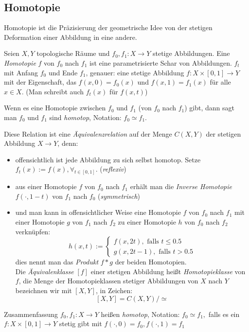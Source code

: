 \documentclass[a4paper,10pt]{scrartcl}
\begin{document}
\subsection{Homotopie}
Homotopie ist die Präzisierung der geometrische Idee von der stetigen Deformation einer Abbildung in eine andere.
\begin{df}[Homotopie]
 Seien $X,Y$ topologische Räume und $f_0, f_1: X\to Y$ stetige Abbildungen. Eine \emph{Homotopie} $f$ von $f_0$ nach $f_1$ ist eine parametrisierte Schar von Abbildungen.
$f_t$ mit Anfang $f_0$ und Ende $f_1$, genauer: eine stetige Abbildung $f: X\times[0,1] \to Y$ mit der Eigenschaft, das $f(x,0)=f_0(x)$ und $f(x,1)=f_1(x)$ für alle $x\in X$. (Man schreibt auch $f_t(x)$ für $f(x,t)$)

Wenn es eine Homotopie zwischen $f_0$ und $f_1$ (von $f_0$ nach $f_1$) gibt, dann sagt man $f_0$ und $f_1$ sind \emph{homotop}, Notation: $f_0 \simeq f_1$.
\end{df}
Diese Relation ist eine \emph{Äquivalenzrelation} auf der Menge $C(X,Y)$ der stetigen Abbildung $X\to Y$, denn:
\begin{itemize}
 \item offensichtlich ist jede Abbildung zu sich selbst homotop. Setze $f_t(x):= f(x), \forall_{t \in [0,1]}$. (\emph{reflexiv})
 \item aus einer Homotopie $f$ von $f_0$ nach $f_1$ erhält man die \emph{Inverse Homotopie} $f(\cdot, 1-t)$ von $f_1$ nach $f_0$ (\emph{symmetrisch})
 \item und man kann in offensichtlicher Weise eine Homotopie $f$ von $f_0$ nach $f_1$ mit einer Homotopie $g$ von $f_1$ nach $f_2$ zu einer Homotopie $h$ von $f_0$ nach $f_2$ verknüpfen:
\[
 h(x,t):=\begin{cases}f(x,2t), \text{ falls } t\le 0.5\\ g(x,2t-1), \text{ falls } t>0.5  \end{cases}
\]
dies nennt man das \emph{Produkt} $f*g$ der beiden Homotopien.\\
Die \emph{Äquivalenklasse} $[f]$ einer stetigen Abbildung heißt \emph{Homotopieklasse} von $f$, die Menge der Homotopieklassen stetiger Abbildungen von $X$ nach $Y$ bezeichnen wir mit $[X,Y]$, in Zeichen:
\[
 [X,Y]=C(X,Y)/\simeq
\]
\end{itemize}
\begin{seg}{Zusammenfassung}
 $f_0, f_1: X\to Y$ heißen \emph{homotop}, Notation: $f_0 \simeq f_1,$ falls es ein $f: X\times [0,1] \to  Y$ stetig gibt mit $f(\cdot, 0)=f_0, f(\cdot, 1)=f_1$
\end{seg}
\end{document}
